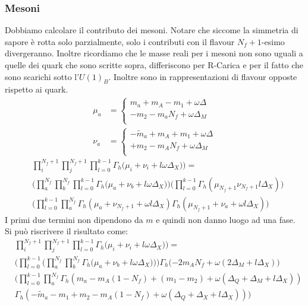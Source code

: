 \documentclass[a4paper,12pt]{article}
\begin{document}
\subsubsection{Mesoni}
Dobbiamo calcolare il contributo dei mesoni. Notare che siccome la simmetria di sapore è rotta solo parzialmente, solo i contributi con il flavour $N_f + 1$-esimo divergeranno. Inoltre ricordiamo che le masse reali per i mesoni non sono uguali a quelle dei quark che sono scritte sopra, differiscono per R-Carica e per il fatto che sono scarichi sotto l'$U(1)_B$. Inoltre sono in rappresentazioni di flavour opposte rispetto ai quark.
\begin{align*}
	\mu_a &  = \begin{cases}
	m_a + m_A - m_1 + \omega \Delta \\
	-m_2 - m_a N_f + \omega \Delta_M\\
	\end{cases}
	\\
\nu_a & = 	\begin{cases}
	- \tilde{m}_a + m_A + m_1 + \omega \Delta \\
	+ m_2 - m_A N_f + \omega \Delta_M \\
	\end{cases}
\end{align*}
\begin{align*}
 & \prod_i^{N_f+1} \prod_j^{N_f+1}  \prod_{l=0}^{k-1}    \Gamma_h \big( \mu_i+  \nu_i + l \omega \Delta_X) \big)  = \\ &
\bigg( \prod_a^{N_f} \prod_b^{N_f}  \prod_{l=0}^{k-1} \Gamma_h \big(   \mu_a + \nu_b + l \omega \Delta_X \big)  \bigg)   \bigg( \prod_{l=0}^{k-1} \Gamma_h( \mu_{N_f+1} \nu_{N_f+1}  l \Delta_X) \bigg) \\
&  \bigg(  \prod_{l=0}^{k-1} \prod_a^{N_f} \Gamma_h ( \mu_a + \nu_{N_f+1} + \omega l \Delta_X) \Gamma_h(  \mu_{N_f+1} + \nu_{a} + \omega l \Delta_X)  \bigg) 
\end{align*}
I primi due termini non dipendono da $m$ e quindi non danno luogo ad una fase. Si può riscrivere il risultato come:
\begin{align*}
& \prod_i^{N_f+1} \prod_j^{N_f+1}  \prod_{l=0}^{k-1}   \Gamma_h \big( \mu_i+  \nu_i + l \omega \Delta_X) \big)  = \\
& \bigg(  \prod_{l=0}^{k-1}  \bigg ( \prod_a^{N_f} \prod_b^{N_f} \Gamma_h \big( \mu_a + \nu_b + l \omega \Delta_X) \big)  \bigg)\Gamma_h( - 2 m_A N_f + \omega ( 2 \Delta_M +  l \Delta_X) \bigg)  \\
 &  \bigg(  \prod_{l=0}^{k-1} \prod_a^{N_f} \Gamma_h (m_a - m_A (1-N_f) + (m_1 - m_2) + \omega ( \Delta_Q + \Delta_M + l \Delta_X))\\
 & \Gamma_h(  - \tilde{m}_a - m_1 + m_2 - m_A ( 1 - N_f) + \omega ( \Delta_Q + \Delta_X + l \Delta_X) ) \bigg) 
\end{align*}
\end{document}
